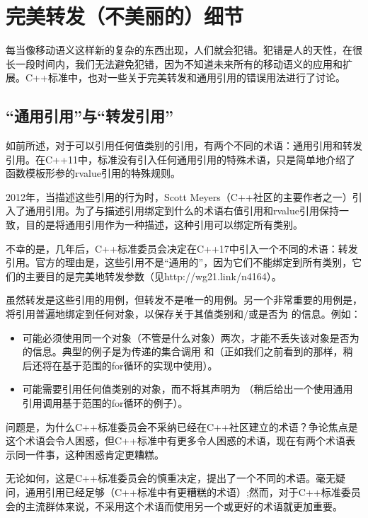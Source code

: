 \section{完美转发（不美丽的）细节}
每当像移动语义这样新的复杂的东西出现，人们就会犯错。犯错是人的天性，在很长一段时间内，我们无法避免犯错，因为不知道未来所有的移动语义的应用和扩展。C++标准中，也对一些关于完美转发和通用引用的错误用法进行了讨论。

\subsection{“通用引用”与“转发引用”}

如前所述，对于可以引用任何值类别的引用，有两个不同的术语：通用引用和转发引用。在C++11中，标准没有引入任何通用引用的特殊术语，只是简单地介绍了函数模板形参的rvalue引用的特殊规则。

2012年，当描述这些引用的行为时，Scott Meyers（C++社区的主要作者之一）引入了通用引用。为了与描述引用绑定到什么的术语右值引用和rvalue引用保持一致，目的是将通用引用作为一种描述，这种引用可以绑定所有类别。

不幸的是，几年后，C++标准委员会决定在C++17中引入一个不同的术语：转发引用。官方的理由是，这些引用不是“通用的”，因为它们不能绑定到所有类别，它们的主要目的是完美地转发参数（见http://wg21.link/n4164）。

虽然转发是这些引用的用例，但转发不是唯一的用例。另一个非常重要的用例是，将引用普遍地绑定到任何对象，以保存关于其值类别和/或是否为  的信息。例如：

\begin{itemize}
	\item 可能必须使用同一个对象（不管是什么对象）两次，才能不丢失该对象是否为  的信息。典型的例子是为传递的集合调用  和\cppinline{}（正如我们之前看到的那样，稍后还将在基于范围的for循环的实现中使用）。
	\item 可能需要引用任何值类别的对象，而不将其声明为 （稍后给出一个使用通用引用调用基于范围的for循环的例子）。
\end{itemize}

问题是，为什么C++标准委员会不采纳已经在C++社区建立的术语？争论焦点是这个术语会令人困惑，但C++标准中有更多令人困惑的术语，现在有两个术语表示同一件事，这种困惑肯定更糟糕。

无论如何，这是C++标准委员会的慎重决定，提出了一个不同的术语。毫无疑问，通用引用已经足够（C++标准中有更糟糕的术语）;然而，对于C++标准委员会的主流群体来说，不采用这个术语而使用另一个或更好的术语就更加重要。

